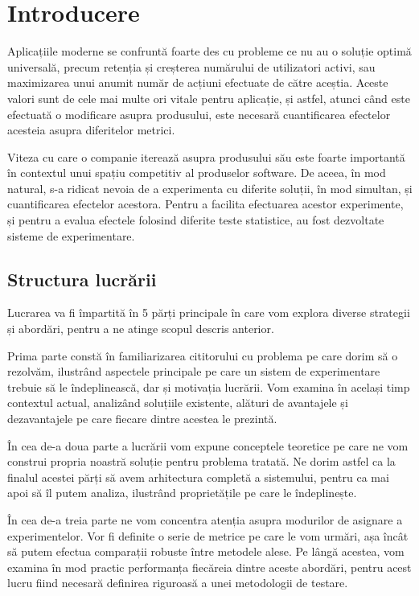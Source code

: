 \chapter{Introducere}

Aplicațiile moderne se confruntă foarte des cu probleme ce nu au o soluție optimă universală, precum retenția și creșterea numărului de utilizatori activi, sau maximizarea unui anumit număr de acțiuni efectuate de către aceștia. Aceste valori sunt de cele mai multe ori vitale pentru aplicație, și astfel, atunci când este efectuată o modificare asupra produsului, este necesară cuantificarea efectelor acesteia asupra diferitelor metrici. 

Viteza cu care o companie iterează asupra produsului său este foarte importantă în contextul unui spațiu competitiv al produselor software. De aceea, în mod natural, s-a ridicat nevoia de a experimenta cu diferite soluții, în mod simultan, și cuantificarea efectelor acestora. Pentru a facilita efectuarea acestor experimente, și pentru a evalua efectele folosind diferite teste statistice, au fost dezvoltate sisteme de experimentare. 


\section{Structura lucrării}

Lucrarea va fi împartită în 5 părți principale în care vom explora diverse strategii și abordări, pentru a ne atinge scopul descris anterior. 

Prima parte constă în familiarizarea cititorului cu problema pe care dorim să o rezolvăm, ilustrând aspectele principale pe care un sistem de experimentare trebuie să le îndeplinească, dar și motivația lucrării. Vom examina în același timp contextul actual, analizând soluțiile existente, alături de avantajele și dezavantajele pe care fiecare dintre acestea le prezintă.

În cea de-a doua parte a lucrării vom expune conceptele teoretice pe care ne vom construi propria noastră soluție pentru problema tratată. Ne dorim astfel ca la finalul acestei părți să avem arhitectura completă a sistemului, pentru ca mai apoi să îl putem analiza, ilustrând proprietățile pe care le îndeplinește.

În cea de-a treia parte ne vom concentra atenția asupra modurilor de asignare a experimentelor. Vor fi definite o serie de metrice pe care le vom urmări, așa încât să putem efectua comparații robuste între metodele alese. Pe lângă acestea, vom examina în mod practic performanța fiecăreia dintre aceste abordări, pentru acest lucru fiind necesară definirea riguroasă a unei metodologii de testare.

